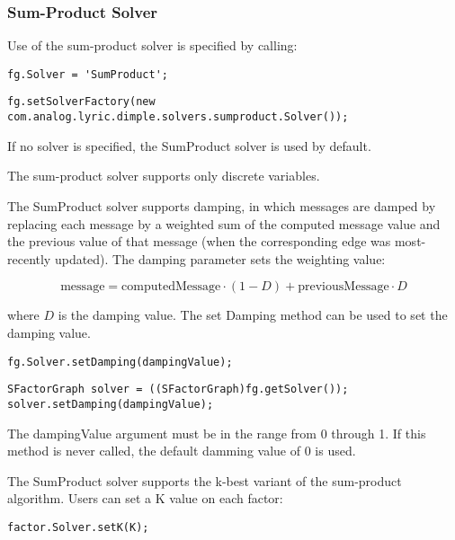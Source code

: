 \subsubsection{Sum-Product Solver}

Use of the sum-product solver is specified by calling:

\ifmatlab
\begin{lstlisting}
fg.Solver = 'SumProduct';
\end{lstlisting}
\fi

\ifjava
\begin{lstlisting}
fg.setSolverFactory(new com.analog.lyric.dimple.solvers.sumproduct.Solver());
\end{lstlisting}
\fi

If no solver is specified, the SumProduct solver is used by default.

The sum-product solver supports only discrete variables.



The SumProduct solver supports damping, in which messages are damped by replacing each message by a weighted sum of the computed message value and the previous value of that message (when the corresponding edge was most-recently updated).  The damping parameter sets the weighting value:

\[
\mathrm{message} = \mathrm{computedMessage} \cdot (1 - D) + \mathrm{previousMessage} \cdot D
\]

where $D$ is the damping value.  The set Damping method can be used to set the damping value.

\ifmatlab
\begin{lstlisting}
fg.Solver.setDamping(dampingValue);
\end{lstlisting}
\fi

\ifjava
\begin{lstlisting}
SFactorGraph solver = ((SFactorGraph)fg.getSolver());
solver.setDamping(dampingValue);
\end{lstlisting}
\fi

The dampingValue argument must be in the range from 0 through 1.  If this method is never called, the default damming value of 0 is used.



The SumProduct solver supports the k-best variant of the sum-product algorithm.  Users can set a K value on each factor:

\ifmatlab
\begin{lstlisting}
factor.Solver.setK(K);
\end{lstlisting}
\fi

